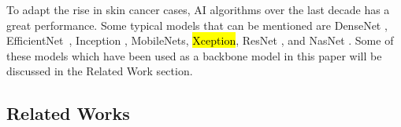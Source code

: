 \documentclass[sensors,article,accept,pdftex,moreauthors]{Definitions/mdpi}
\begin{document}
	To adapt the rise in skin cancer cases, AI algorithms over the last decade has a great performance. Some typical models that can be mentioned are DenseNet \cite{06993}, EfficientNet~\cite{04861}, Inception \cite{00567,07261}, MobileNets\cite{04861,04381,02244}, \hl{Xception\mbox{\cite{02357}}}, ResNet \cite{03385,05027}, and NasNet \cite{07012}. Some of these models which have been used as a backbone model in this paper will be discussed in the Related Work section.
	
	\subsection{Related Works}
		
		
		
\end{document}
